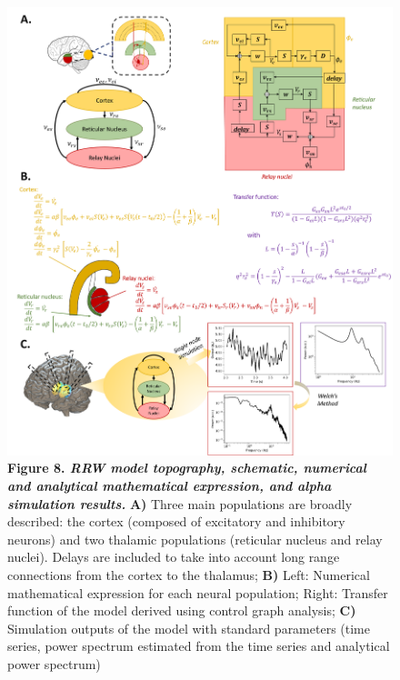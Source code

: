 \documentclass[12pt,twoside]{article}
\begin{document}
\begin{figure}[H]
    \centering
    \includegraphics[scale=0.45]{Images/Robinson_schematic_4.png}
    \caption*{\textbf{Figure 8.  \textit{RRW model topography, schematic, numerical and analytical mathematical expression, and alpha simulation results.}} \textbf{A)} Three main populations are broadly described: the cortex (composed of excitatory and inhibitory neurons) and two thalamic populations (reticular nucleus and relay nuclei). Delays are included to take into account long range connections from the cortex to the thalamus; \textbf{B)} Left: Numerical mathematical expression for each neural population; Right: Transfer function of the model derived using control graph analysis; \textbf{C)} Simulation outputs of the model with standard parameters (time series, power spectrum estimated from the time series and analytical power spectrum)}            
    \label{fig:Rob_topography}
\end{figure}


\end{document}
